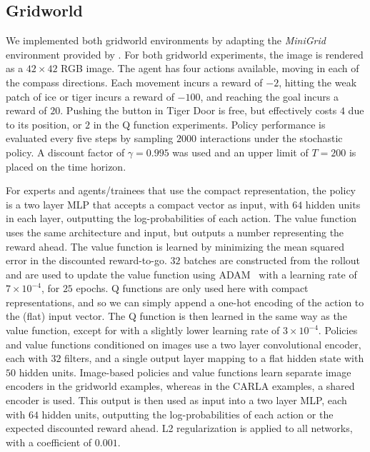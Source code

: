 \subsection{Gridworld}

We implemented both gridworld environments by adapting the \emph{MiniGrid} environment provided by \citet{gym_minigrid}.  For both gridworld experiments, the image is rendered as a $42 \times 42$ RGB image.  The agent has four actions available, moving in each of the compass directions.  Each movement incurs a reward of $-2$, hitting the weak patch of ice or tiger incurs a reward of $-100$, and reaching the goal incurs a reward of $20$.  Pushing the button in Tiger Door is free, but effectively costs $4$ due to its position, or $2$ in the Q function experiments.  Policy performance is evaluated every five steps by sampling $2000$ interactions under the stochastic policy.  A discount factor of $\gamma=0.995$ was used and an upper limit of $T=200$ is placed on the time horizon.

For experts and agents/trainees that use the compact representation, the policy is a two layer MLP that accepts a compact vector as input, with $64$ hidden units in each layer, outputting the log-probabilities of each action.  The value function uses the same architecture and input, but outputs a number representing the reward ahead.   The value function is learned by minimizing the mean squared error in the discounted reward-to-go.  $32$ batches are constructed from the rollout and are used to update the value function using ADAM~\citep{kingma2014adam} with a learning rate of $7 \times 10^{-4}$, for $25$ epochs.  Q functions are only used here with compact representations, and so we can simply append a one-hot encoding of the action to the (flat) input vector.  The Q function is then learned in the same way as the value function, except for with a slightly lower learning rate of $3\times 10^{-4}$.  Policies and value functions conditioned on images use a two layer convolutional encoder, each with $32$ filters, and a single output layer mapping to a flat hidden state with $50$ hidden units.  Image-based policies and value functions learn separate image encoders in the gridworld examples, whereas in the CARLA examples, a shared encoder is used.  This output is then used as input into a two layer MLP, each with $64$ hidden units, outputting the log-probabilities of each action or the expected discounted reward ahead.   L2 regularization is applied to all networks, with a coefficient of $0.001$.  

